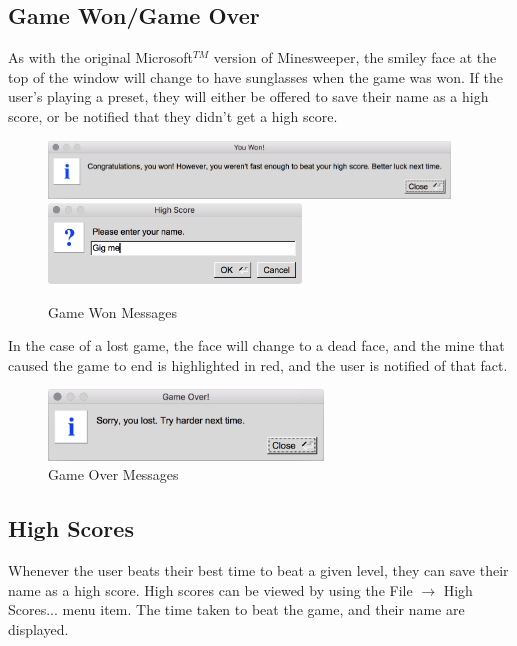 \documentclass[11pt]{article}
\begin{document}
\subsection{Game Won/Game Over}
As with the original Microsoft$^{TM}$ version of Minesweeper, the smiley face at the top of the window will change to have sunglasses when the game was won. If the user's playing a preset, they will either be offered to save their name as a high score, or be notified that they didn't get a high score.

\begin{figure}[htbp]
   \centering
   \includegraphics[width=0.95\textwidth]{wonMessage.png}
   \includegraphics[width=0.6\textwidth]{newHighScore.png}
   \caption{Game Won Messages}
\end{figure}

In the case of a lost game, the face will change to a dead face, and the mine that caused the game to end is highlighted in red, and the user is notified of that fact.

\begin{figure}[htbp]
   \centering
   \includegraphics[width=0.65\textwidth]{gameOverMsg.png}
   \caption{Game Over Messages}
\end{figure}

\subsection{High Scores}
Whenever the user beats their best time to beat a given level, they can save their name as a high score. High scores can be viewed by using the File $\rightarrow$ High Scores... menu item. The time taken to beat the game, and their name are displayed.
\end{document}
